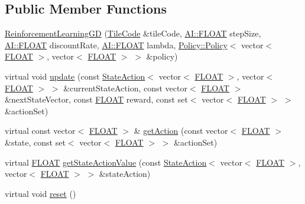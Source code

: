 \subsection*{Public Member Functions}
\begin{DoxyCompactItemize}
\item 
\hyperlink{classAI_1_1Algorithm_1_1ReinforcementLearningGD_a51985e4bd95a874482c4cc378b0fc86e}{Reinforcement\+Learning\+G\+D} (\hyperlink{classAI_1_1Algorithm_1_1TileCode}{Tile\+Code} \&tile\+Code, \hyperlink{namespaceAI_a41b74884a20833db653dded3918e05c3}{A\+I\+::\+F\+L\+O\+A\+T} step\+Size, \hyperlink{namespaceAI_a41b74884a20833db653dded3918e05c3}{A\+I\+::\+F\+L\+O\+A\+T} discount\+Rate, \hyperlink{namespaceAI_a41b74884a20833db653dded3918e05c3}{A\+I\+::\+F\+L\+O\+A\+T} lambda, \hyperlink{classAI_1_1Algorithm_1_1Policy_1_1Policy}{Policy\+::\+Policy}$<$ vector$<$ \hyperlink{namespaceAI_a41b74884a20833db653dded3918e05c3}{F\+L\+O\+A\+T} $>$, vector$<$ \hyperlink{namespaceAI_a41b74884a20833db653dded3918e05c3}{F\+L\+O\+A\+T} $>$ $>$ \&policy)
\item 
virtual void \hyperlink{classAI_1_1Algorithm_1_1ReinforcementLearningGD_afca8d60ac090dec611f3834c0e8872c0}{update} (const \hyperlink{classAI_1_1StateAction}{State\+Action}$<$ vector$<$ \hyperlink{namespaceAI_a41b74884a20833db653dded3918e05c3}{F\+L\+O\+A\+T} $>$, vector$<$ \hyperlink{namespaceAI_a41b74884a20833db653dded3918e05c3}{F\+L\+O\+A\+T} $>$ $>$ \&current\+State\+Action, const vector$<$ \hyperlink{namespaceAI_a41b74884a20833db653dded3918e05c3}{F\+L\+O\+A\+T} $>$ \&next\+State\+Vector, const \hyperlink{namespaceAI_a41b74884a20833db653dded3918e05c3}{F\+L\+O\+A\+T} reward, const set$<$ vector$<$ \hyperlink{namespaceAI_a41b74884a20833db653dded3918e05c3}{F\+L\+O\+A\+T} $>$ $>$ \&action\+Set)
\item 
virtual const vector$<$ \hyperlink{namespaceAI_a41b74884a20833db653dded3918e05c3}{F\+L\+O\+A\+T} $>$ \& \hyperlink{classAI_1_1Algorithm_1_1ReinforcementLearningGD_a97a8fe122f39d0b47a9df496502c2555}{get\+Action} (const vector$<$ \hyperlink{namespaceAI_a41b74884a20833db653dded3918e05c3}{F\+L\+O\+A\+T} $>$ \&state, const set$<$ vector$<$ \hyperlink{namespaceAI_a41b74884a20833db653dded3918e05c3}{F\+L\+O\+A\+T} $>$ $>$ \&action\+Set)
\item 
virtual \hyperlink{namespaceAI_a41b74884a20833db653dded3918e05c3}{F\+L\+O\+A\+T} \hyperlink{classAI_1_1Algorithm_1_1ReinforcementLearningGD_a937edc4d2b11025bccbd450163155660}{get\+State\+Action\+Value} (const \hyperlink{classAI_1_1StateAction}{State\+Action}$<$ vector$<$ \hyperlink{namespaceAI_a41b74884a20833db653dded3918e05c3}{F\+L\+O\+A\+T} $>$, vector$<$ \hyperlink{namespaceAI_a41b74884a20833db653dded3918e05c3}{F\+L\+O\+A\+T} $>$ $>$ \&state\+Action)
\item 
virtual void \hyperlink{classAI_1_1Algorithm_1_1ReinforcementLearningGD_ad6f2fa8bc762d6760e9c61a132ccd098}{reset} ()
\end{DoxyCompactItemize}
